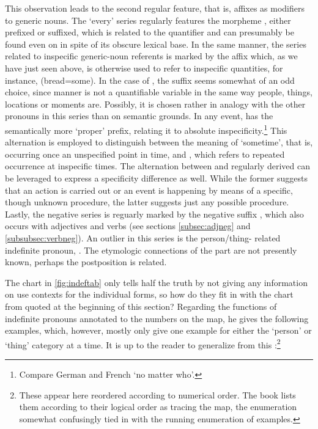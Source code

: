 This observation leads to the second regular feature, that is, affixes as 
modifiers to generic nouns. The `every' series regularly features the 
morpheme , either prefixed or suffixed, which is related to the 
quantifier  and can presumably be found 
even on  in spite of its obscure lexical base. In the same 
manner, the series related to inspecific generic-noun referents is marked by 
the affix  which, as we have just seen above, is otherwise 
used to refer to inspecific quantities, for instance, 
 (bread=some). In the case of 
, the suffix seems somewhat of an 
odd choice, since manner is not a quantifiable variable in the same way people,
things, locations or moments are. Possibly, it is chosen rather in analogy with
the other pronouns in this series than on semantic grounds. In any event,
 has the semantically more `proper'  prefix,
relating it to absolute inspecificity.\footnote{Compare German
 and French  `no matter who'.} This 
alternation is employed to distinguish between the meaning of `sometime', that 
is, occurring once an unspecified point in time, and 
, which refers to repeated occurrence at
inspecific times. The alternation between  and
regularly derived  can be leveraged to express a
specificity difference as well. While the former suggests that an action is
carried out or an event is happening by means of a specific, though unknown
procedure, the latter suggests just any possible procedure. Lastly, the
negative series is reguarly marked by the negative suffix ,
which also occurs with adjectives and verbs (see sections \ref{subsec:adjneg}
and \ref{subsubsec:verbneg}). An outlier in this series is the person/thing-
related indefinite pronoun, . The etymologic connections of
the  part are not presently known, perhaps the postposition
 is related.

The chart in \autoref{fig:indeftab} only tells half the truth by not giving any
information on use contexts for the individual forms, so how do they fit in
with the chart from \citet{haspelmath1997} quoted at the beginning of this
section? Regarding the functions of indefinite pronouns annotated to the
numbers on the map, he gives the following examples, which, however, mostly
only give one example for either the `person' or `thing' category at a time. It
is up to the reader to generalize from this
\citep[2--3]{haspelmath1997}:\footnote{These appear here reordered according to
numerical order. The book lists them according to their logical order as
tracing the map, the enumeration somewhat confusingly tied in with the running
enumeration of examples.}

